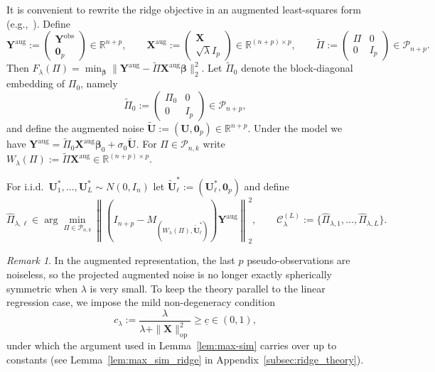 \documentclass[11pt, reqno]{amsart}
\newcommand{\R}{\mathbb{R}}
\renewcommand{\tilde}{\widetilde}
\renewcommand{\hat}{\widehat}
\renewcommand{\ge}{\geqslant}
\newcommand{\mC}{\mathcal{C}}
\newcommand{\mP}{\mathcal{P}}
\newcommand{\1}{\mbox{1}\hspace{-0.25em}\mbox{l}}
\theoremstyle{definition}\newtheorem{problem}{Problem}[section]
\theoremstyle{definition}\newtheorem{definition}[problem]{Definition}
\theoremstyle{remark}\newtheorem{assumption}{Assumption}
\theoremstyle{remark}\newtheorem{remark}[problem]{Remark}
\theoremstyle{definition}\newtheorem{example}[problem]{Example}
\theoremstyle{plain}\newtheorem{theorem}[problem]{Theorem}
\theoremstyle{plain}\newtheorem{question}[problem]{Question}
\theoremstyle{plain}\newtheorem{lemma}[problem]{Lemma}
\theoremstyle{plain}\newtheorem{proposition}[problem]{Proposition}
\theoremstyle{plain}\newtheorem{corollary}[problem]{Corollary}
\theoremstyle{plain}\newtheorem{conjecture}[problem]{Conjecture}
\begin{document}
It is convenient to rewrite the ridge objective in an augmented least-squares form
(e.g.,~\cite{hastie2020ridge}). Define
\[
\bm Y^{\mathrm{aug}}:=\begin{pmatrix}\bm Y^{\mathrm{obs}}\\ \bm 0_p\end{pmatrix}\in\R^{n+p},
\qquad
\bm X^{\mathrm{aug}}:=\begin{pmatrix}\bm X\\ \sqrt{\lambda}I_p\end{pmatrix}\in\R^{(n+p)\times p},
\qquad
\tilde\Pi:=\begin{pmatrix}\Pi & 0\\ 0 & I_p\end{pmatrix}\in\mathcal P_{n+p}.
\]
Then $F_\lambda(\Pi)=\min_{\bm{\beta}}\|\bm Y^{\mathrm{aug}}-\tilde\Pi\bm X^{\mathrm{aug}}\bm{\beta}\|_2^2$.
Let $\tilde\Pi_0$ denote the block-diagonal embedding of $\Pi_0$, namely
\[
\tilde\Pi_0 := \begin{pmatrix}\Pi_0 & 0\\ 0 & I_p\end{pmatrix}\in\mathcal P_{n+p},
\]
and define the augmented noise $\tilde{\bm U}:=(\bm U,\bm 0_p)\in\R^{n+p}$.
Under the model we have $\bm Y^{\mathrm{aug}}=\tilde\Pi_0\bm X^{\mathrm{aug}}\bm{\beta}_0+\sigma_0\tilde{\bm U}$.
For $\Pi\in\mP_{n,k}$ write $
W_\lambda(\Pi):=\tilde\Pi\bm X^{\mathrm{aug}}\in\R^{(n+p)\times p}$.

For i.i.d.\ $\bm U^*_1,\dots,\bm U^*_L\sim N(0,I_n)$ let
$\tilde{\bm U}^*_\ell:=(\bm U^*_\ell,\bm 0_p)$ and define
\begin{equation}\label{eq:perm_candidates_ridge}
\hat\Pi_{\lambda,\ell}\in
\arg\min_{\Pi\in\mP_{n,k}}
\left\|
(I_{n+p}-M_{(W_\lambda(\Pi),\tilde{\bm U}^*_\ell)})\bm Y^{\mathrm{aug}}
\right\|_2^2,
\qquad
\mC_\lambda^{(L)}:=\{\hat\Pi_{\lambda,1},\dots,\hat\Pi_{\lambda,L}\}.
\end{equation}

\begin{remark} In the augmented representation, the last $p$ pseudo-observations are noiseless, so the projected augmented noise is no longer exactly spherically symmetric when $\lambda$ is very small. To keep the theory parallel to the linear regression case, we impose the mild non-degeneracy condition \begin{equation}\label{eq:ridge_lambda_lower} c_\lambda:=\frac{\lambda}{\lambda+\|\bm X\|_{\mathrm{op}}^2}\ge \underline c\in(0,1), \end{equation} under which the argument used in Lemma~\ref{lem:max-sim} carries over up to constants (see Lemma~\ref{lem:max_sim_ridge} in Appendix~\ref{subsec:ridge_theory}). \end{remark}
\end{document}
